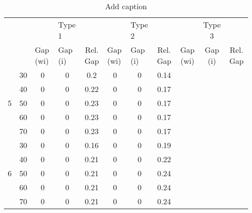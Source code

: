 \begin{table}[htbp]
  \centering
  \caption{Add caption}
    \begin{tabular}{|c|c|p{3.855em}p{3.07em}c|p{3.855em}p{3.07em}c|ccc|}
    \toprule
          &       & \multicolumn{1}{c}{} & Type 1 &       & \multicolumn{1}{c}{} & Type 2 &       &       & \multicolumn{1}{p{3.07em}}{Type 3} &  \\
          &       & Gap (wi) & Gap (i) & \multicolumn{1}{p{3.785em}|}{Rel. Gap} & Gap (wi) & Gap (i) & \multicolumn{1}{p{3.785em}|}{Rel. Gap} & \multicolumn{1}{p{3.855em}}{Gap (wi)} & \multicolumn{1}{p{3.07em}}{Gap (i)} & \multicolumn{1}{p{3.785em}|}{Rel. Gap} \\
    \midrule
          & 30    & \multicolumn{1}{c}{0} & \multicolumn{1}{c}{0} & 0.2   & \multicolumn{1}{c}{0} & \multicolumn{1}{c}{0} & 0.14  &       &       &  \\
          & 40    & \multicolumn{1}{c}{0} & \multicolumn{1}{c}{0} & 0.22  & \multicolumn{1}{c}{0} & \multicolumn{1}{c}{0} & 0.17  &       &       &  \\
    5     & 50    & \multicolumn{1}{c}{0} & \multicolumn{1}{c}{0} & 0.23  & \multicolumn{1}{c}{0} & \multicolumn{1}{c}{0} & 0.17  &       &       &  \\
          & 60    & \multicolumn{1}{c}{0} & \multicolumn{1}{c}{0} & 0.23  & \multicolumn{1}{c}{0} & \multicolumn{1}{c}{0} & 0.17  &       &       &  \\
          & 70    & \multicolumn{1}{c}{0} & \multicolumn{1}{c}{0} & 0.23  & \multicolumn{1}{c}{0} & \multicolumn{1}{c}{0} & 0.17  &       &       &  \\
    \midrule
          & 30    & \multicolumn{1}{c}{0} & \multicolumn{1}{c}{0} & 0.16  & \multicolumn{1}{c}{0} & \multicolumn{1}{c}{0} & 0.19  &       &       &  \\
          & 40    & \multicolumn{1}{c}{0} & \multicolumn{1}{c}{0} & 0.21  & \multicolumn{1}{c}{0} & \multicolumn{1}{c}{0} & 0.22  &       &       &  \\
    6     & 50    & \multicolumn{1}{c}{0} & \multicolumn{1}{c}{0} & 0.21  & \multicolumn{1}{c}{0} & \multicolumn{1}{c}{0} & 0.24  &       &       &  \\
          & 60    & \multicolumn{1}{c}{0} & \multicolumn{1}{c}{0} & 0.21  & \multicolumn{1}{c}{0} & \multicolumn{1}{c}{0} & 0.24  &       &       &  \\
          & 70    & \multicolumn{1}{c}{0} & \multicolumn{1}{c}{0} & 0.21  & \multicolumn{1}{c}{0} & \multicolumn{1}{c}{0} & 0.24  &       &       &  \\

\end{tabular}
\end{table}
